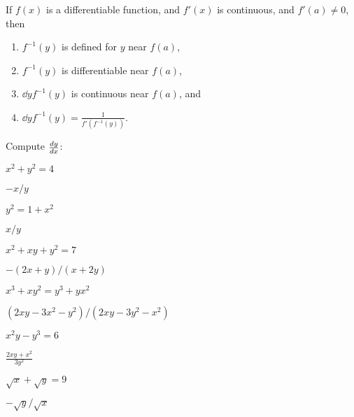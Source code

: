 \begin{mainTheorem}
If $f(x)$ is a differentiable function, and $f'(x)$ is continuous, and
$f'(a) \neq 0$, then
\begin{enumerate}
\item $f^{-1}(y)$ is defined for $y$ near $f(a)$,
\item $f^{-1}(y)$ is differentiable near $f(a)$, 
\item $\dd{y} f^{-1}(y)$ is continuous near $f(a)$, and
\item $\dd{y} f^{-1}(y)  = \displaystyle\frac{1}{f'(f^{-1}(y))}$.
\end{enumerate}
\end{mainTheorem}




\begin{exercises}

\noindent Compute $\frac{dy}{dx}$:
\twocol

\begin{exercise} $x^2 + y^2 = 4$
\begin{answer} $-x/y$
\end{answer}\end{exercise}

\begin{exercise} $y^2=1+x^2$
\begin{answer} $x/y$
\end{answer}\end{exercise}

\begin{exercise} $x^2+xy+y^2=7$
\begin{answer} $-(2x+y)/(x+2y)$
\end{answer}\end{exercise}

\begin{exercise} $x^3+xy^2=y^3+yx^2$
\begin{answer} $(2xy-3x^2-y^2)/(2xy-3y^2-x^2)$
\end{answer}\end{exercise}

\begin{exercise} $x^2y-y^3 = 6$
\begin{answer} $\frac{2xy+x^2}{3y^2}$
\end{answer}\end{exercise}

\begin{exercise} $\sqrt{x} + \sqrt{y} = 9$
\begin{answer} $-\sqrt{y}/\sqrt{x}$
\end{answer}\end{exercise}


\end{exercises}
